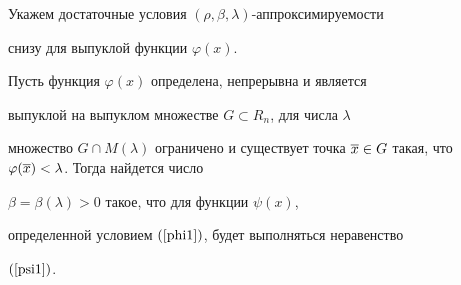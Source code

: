 Укажем достаточные условия $(\rho,\beta,\lambda)$-аппроксимируемости 


снизу для выпуклой функции $\varphi(x)$.





\begin{lem}\label{ro1}


Пусть функция $\varphi(x)$ определена, непрерывна и является


выпуклой на выпуклом множестве $G\subset R_n$, для числа $\lambda$


множество $G\cap M(\lambda)$ ограничено и существует точка $\o


x\in G$ такая, что $\varphi(\o x)<\lambda$. Тогда найдется число


$\beta=\beta(\lambda)>0$ такое, что для функции $\psi(x)$,


определенной условием $(\ref{phi1})$, будет выполняться неравенство


$(\ref{psi1})$.


\end{lem}





